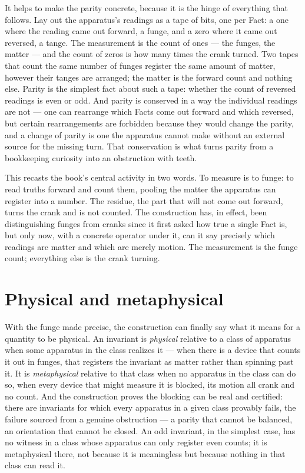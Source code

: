 It helps to make the parity concrete, because it is the hinge of everything that follows. Lay out the
apparatus's readings as a tape of bits, one per Fact: a one where the reading came out forward, a funge,
and a zero where it came out reversed, a tange. The measurement is the count of ones --- the funges, the
matter --- and the count of zeros is how many times the crank turned. Two tapes that count the same
number of funges register the same amount of matter, however their tanges are arranged; the matter is
the forward count and nothing else. Parity is the simplest fact about such a tape: whether the count of
reversed readings is even or odd. And parity is conserved in a way the individual readings are not ---
one can rearrange which Facts come out forward and which reversed, but certain rearrangements are
forbidden because they would change the parity, and a change of parity is one the apparatus cannot make
without an external source for the missing turn. That conservation is what turns parity from a
bookkeeping curiosity into an obstruction with teeth.

This recasts the book's central activity in two words. To measure is to funge: to read truths forward
and count them, pooling the matter the apparatus can register into a number. The residue, the part that
will not come out forward, turns the crank and is not counted. The construction has, in effect, been
distinguishing funges from cranks since it first asked how true a single Fact is, but only now, with a
concrete operator under it, can it say precisely which readings are matter and which are merely motion.
The measurement is the funge count; everything else is the crank turning.

\section{Physical and metaphysical}
\label{se:physical-and-metaphysical}

With the funge made precise, the construction can finally say what it means for a quantity to be
physical. An invariant is \emph{physical} relative to a class of apparatus when some apparatus in the
class realizes it --- when there is a device that counts it out in funges, that registers the invariant
as matter rather than spinning past it. It is \emph{metaphysical} relative to that class when no
apparatus in the class can do so, when every device that might measure it is blocked, its motion all
crank and no count. And the construction proves the blocking can be real and certified: there are
invariants for which every apparatus in a given class provably fails, the failure sourced from a genuine
obstruction --- a parity that cannot be balanced, an orientation that cannot be closed. An odd invariant,
in the simplest case, has no witness in a class whose apparatus can only register even counts; it is
metaphysical there, not because it is meaningless but because nothing in that class can read it.


